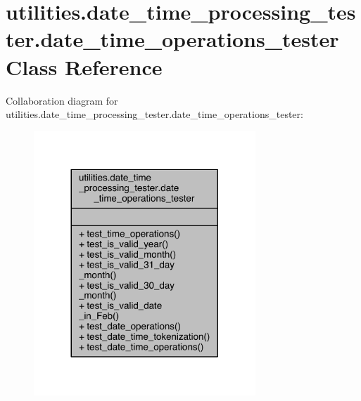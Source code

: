 \hypertarget{classutilities_1_1date__time__processing__tester_1_1date__time__operations__tester}{}\section{utilities.\+date\+\_\+time\+\_\+processing\+\_\+tester.\+date\+\_\+time\+\_\+operations\+\_\+tester Class Reference}
\label{classutilities_1_1date__time__processing__tester_1_1date__time__operations__tester}


Collaboration diagram for utilities.\+date\+\_\+time\+\_\+processing\+\_\+tester.\+date\+\_\+time\+\_\+operations\+\_\+tester\+:
\nopagebreak
\begin{figure}[H]
\begin{center}
\leavevmode
\includegraphics[width=236pt]{de/de1/classutilities_1_1date__time__processing__tester_1_1date__time__operations__tester__coll__graph}
\end{center}
\end{figure}

